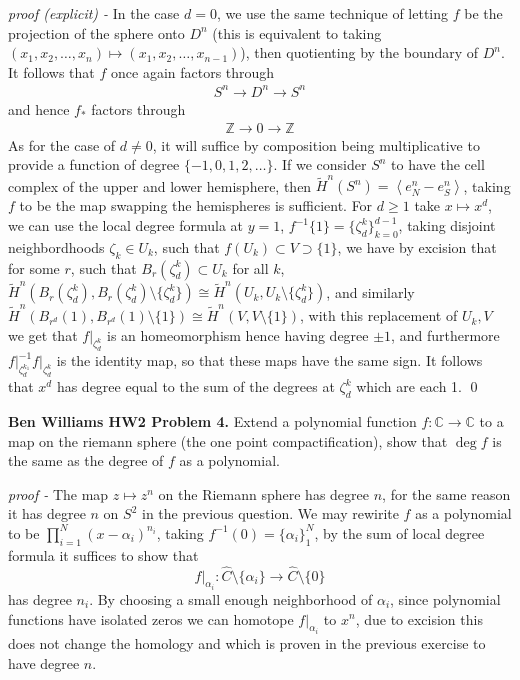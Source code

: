 \documentclass[11pt]{article}
\theoremstyle{definition}
\newcommand{\set}[1]{\{#1\}}
\newcommand{\gen}[1]{\left\langle #1 \right\rangle}
\begin{document}
    \emph{proof (explicit) - } In the case \(d = 0\), we use the same technique of letting \(f\) be the projection of the sphere onto \(D^n\) (this is equivalent to taking \((x_1,x_2,\hdots,x_n) \mapsto (x_1,x_2, \hdots, x_{n-1})\)), then quotienting by the boundary of \(D^n\). It follows that \(f\) once again factors through
    \begin{align*}
        S^n \to  D^n \to S^n
    \end{align*}
    and hence \(f_*\) factors through
    \begin{align*}
        \mathbb{Z} \to 0 \to \mathbb{Z}
    \end{align*}
    As for the case of \(d \neq 0\), it will suffice by composition being multiplicative to provide a function of degree \(\set{-1,0,1,2,\hdots}\). If we consider \(S^n\) to have the cell complex of the upper and lower hemisphere, then \(\tilde{H}^n(S^n) = \gen{e^n_N - e^n_S}\), taking \(f\) to be the map swapping the hemispheres is sufficient. For \(d \geq 1\) take \(x \mapsto x^d\), we can use the local degree formula at \(y = 1\), \(f^{-1}\set{1} = \set{\zeta_d^k}_{k=0}^{d-1}\), taking disjoint neighbordhoods \(\zeta_k \in U_k\), such that \(f(U_k) \subset V \supset \set{1}\), we have by excision that for some \(r\), such that \(B_r(\zeta_d^k) \subset U_k\) for all \(k\), \(\tilde{H}^n(B_r(\zeta_d^k),B_r(\zeta_d^k) \setminus \set{\zeta_d^k}) \cong \tilde{H}^n(U_k,U_k \setminus \set{\zeta_d^k})\), and similarly \(\tilde{H}^n(B_{r^d}(1),B_{r^d}(1) \setminus \set{1}) \cong \tilde{H}^n(V,V \setminus \set{1})\), with this replacement of \(U_k, V\) we get that \(f\vert_{\zeta_d^k}\) is an homeomorphism hence having degree \(\pm 1\), and furthermore \(f\vert_{\zeta_d^{k_1}}^{-1}f\vert_{\zeta_d^k}\) is the identity map, so that these maps have the same sign. It follows that \(x^d\) has degree equal to the sum of the degrees at \(\zeta_d^k\) which are each 1. \qed


    \textbf{Ben Williams HW2 Problem 4.} Extend a polynomial function \(f: \mathbb{C} \to \mathbb{C}\) to a map on the riemann sphere (the one point compactification), show that \(\deg f\) is the same as the degree of \(f\) as a polynomial.

    \emph{proof - } The map \(z \mapsto z^n\) on the Riemann sphere has degree \(n\), for the same reason it has degree \(n\) on \(S^2\) in the previous question. We may rewirite \(f\) as a polynomial to be \(\prod_{i=1}^N (x-\alpha_i)^{n_i}\), taking \(f^{-1}(0) = \set{\alpha_i}_1^N\), by the sum of local degree formula it suffices to show that \[f \vert_{\alpha_i} : \hat{C} \setminus \set{\alpha_i} \to \hat{C} \setminus \set{0}\]
    has degree \(n_i\). By choosing a small enough neighborhood of \(\alpha_i\), since polynomial functions have isolated zeros we can homotope \(f \vert_{\alpha_i}\) to \(x^n\), due to excision this does not change the homology and which is proven in the previous exercise to have degree \(n\).
\end{document}
